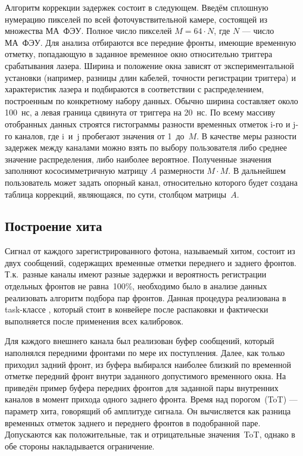 Алгоритм коррекции задержек состоит в следующем. Введём сплошную нумерацию пикселей по всей фоточувствительной камере, состоящей из множества МА~ФЭУ. Полное число пикселей $ M = 64 \cdot N $, где $N$ --- число МА~ФЭУ. Для анализа отбираются все передние фронты, имеющие временную отметку, попадающую в заданное временное окно относительно триггера срабатывания лазера. Ширина и положение окна зависят от экспериментальной установки (например, разницы длин кабелей, точности регистрации триггера) и характеристик лазера и подбираются в соответствии с распределением, построенным по конкретному набору данных. Обычно ширина составляет около 100~нс, а левая граница сдвинута от триггера на 20~нс. По всему массиву отобранных данных строятся гистограммы разности временных отметок i-го и j-го каналов, где i~и~j пробегают значения от 1~до~$M$. В качестве меры разности задержек между каналами можно взять по выбору пользователя либо среднее значение распределения, либо наиболее вероятное. Полученные значения заполняют кососимметричную матрицу $A$ размерности $ M \cdot M $. В дальнейшем пользователь может задать опорный канал, относительно которого будет создана таблица коррекций, являющаяся, по сути, столбцом матрицы~$A$.

\subsection{Построение хита}

Сигнал от каждого зарегистрированного фотона, называемый хитом, состоит из двух сообщений, содержащих временные отметки переднего и заднего фронтов. Т.к.~разные каналы имеют разные задержки и вероятность регистрации отдельных фронтов не равна~100\%, необходимо было в анализе данных реализовать алгоритм подбора пар фронтов. Данная процедура реализована в task-классе , который стоит в конвейере после распаковки и фактически выполняется после применения всех калибровок.

Для каждого внешнего канала был реализован буфер сообщений, который наполнялся передними фронтами по мере их поступления. Далее, как только приходил задний фронт, из буфера выбирался наиболее близкий по временной отметке передний фронт внутри заданного допустимого временного окна. На  приведён пример буфера передних фронтов для заданной пары внутренних каналов в момент прихода одного заднего фронта. Время над порогом~(ToT) --- параметр хита, говорящий об амплитуде сигнала. Он вычисляется как разница временных отметок заднего и переднего фронтов в подобранной паре. Допускаются как положительные, так и отрицательные значения~ToT, однако в обе стороны накладывается ограничение.

